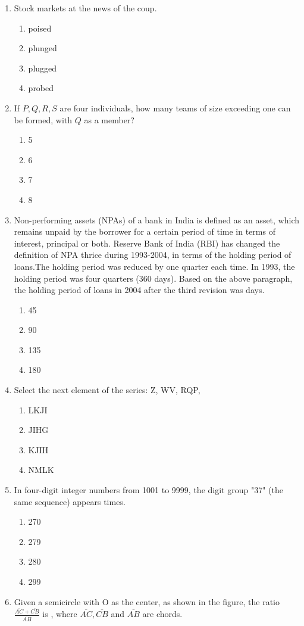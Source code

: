 \documentclass[journal]{IEEEtran}
\begin{document}
\begin{enumerate}
\item Stock markets \underline{\hspace{1cm}} at the news of the coup.
\begin{enumerate}
    \item poised
    \item plunged
    \item plugged
    \item probed
\end{enumerate}
\item If $P,Q,R,S$ are four individuals, how many teams of size exceeding one can be formed, with $Q$ as a member?
\begin{enumerate}
    \item 5
    \item 6
    \item 7
    \item 8
\end{enumerate}
\item Non-performing assets (NPAs) of a bank in India is defined as an asset, which remains unpaid by the borrower for a certain period of time in terms of interest, principal or both. Reserve Bank of India (RBI) has changed the definition of NPA thrice during 1993-2004, in terms of the holding period of loans.The holding period was reduced by one quarter each time. In 1993, the holding period was four quarters (360 days). \bigskip
Based on the above paragraph, the holding period of loans in 2004 after the third revision was \underline{\hspace{1cm}} days.
\begin{enumerate}
    \item 45
    \item 90
    \item 135
    \item 180
\end{enumerate}
\item Select the next element of the series: Z, WV, RQP,\underline{\hspace{1cm}}
\begin{enumerate}
    \item LKJI
    \item JIHG
    \item KJIH
    \item NMLK
\end{enumerate}
\item In four-digit integer numbers from 1001 to 9999, the digit group "37" (the same sequence) appears \underline{\hspace{1cm}} times.
\begin{enumerate}
    \item 270
    \item 279
    \item 280
    \item 299
\end{enumerate}
\item Given a semicircle with O as the center, as shown in the figure, the ratio $\frac{\overline{AC}+\overline{CB}}{\overline{AB}}$ is \underline{\hspace{1cm}}, where $\overline{AC},\overline{CB}$ and $\overline{AB}$ are chords.


\end{enumerate}
\end{document}

